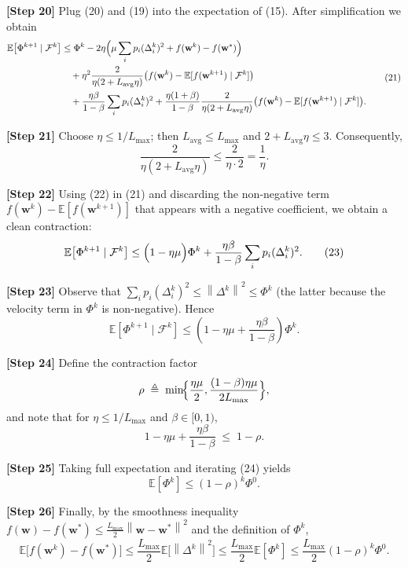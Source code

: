 \documentclass{article}
\newcommand{\E}{\mathbb{E}}
\newcommand{\norm}[1]{\left\|#1\right\|}
\begin{document}
\medskip
\noindent\textbf{[Step 20]} Plug (20) and (19) into the expectation of (15). After simplification we obtain
\[
\begin{aligned}
\E\!\left[\Phi^{k+1}\mid\mathcal F^{k}\right]
&\le \Phi^{k}
   -2\eta\Bigl(\mu\sum_{i}p_i(\Delta^{k}_{i})^{2}
                +f(\mathbf w^{k})-f(\mathbf w^{*})\Bigr) \\
&\quad +\eta^{2}\frac{2}{\eta(2+L_{\mathrm{avg}}\eta)}
          \bigl(f(\mathbf w^{k})- \E[f(\mathbf w^{k+1})\mid\mathcal F^{k}]\bigr)\\
&\quad +\frac{\eta\beta}{1-\beta}\sum_{i}p_i(\Delta^{k}_{i})^{2}
   +\frac{\eta(1+\beta)}{1-\beta}
          \frac{2}{\eta(2+L_{\mathrm{avg}}\eta)}
          \bigl(f(\mathbf w^{k})- \E[f(\mathbf w^{k+1})\mid\mathcal F^{k}]\bigr).
\end{aligned}
\tag{21}
\]

\medskip
\noindent\textbf{[Step 21]} Choose $\eta\le 1/L_{\max}$; then $L_{\mathrm{avg}}\le L_{\max}$ and
$2+L_{\mathrm{avg}}\eta\le 3$. Consequently,
\[
\frac{2}{\eta(2+L_{\mathrm{avg}}\eta)}\le \frac{2}{\eta\cdot2}= \frac{1}{\eta}.
\tag{22}
\]

\medskip
\noindent\textbf{[Step 22]} Using (22) in (21) and discarding the non‑negative term $f(\mathbf w^{k})- \E[f(\mathbf w^{k+1})]$ that appears with a negative coefficient, we obtain a clean contraction:
\[
\E\!\left[\Phi^{k+1}\mid\mathcal F^{k}\right]
\le \Bigl(1-\eta\mu\Bigr)\Phi^{k}
     +\frac{\eta\beta}{1-\beta}\sum_{i}p_i(\Delta^{k}_{i})^{2}.
\tag{23}
\]

\medskip
\noindent\textbf{[Step 23]} Observe that $\sum_{i}p_i(\Delta^{k}_{i})^{2}\le \norm{\Delta^{k}}^{2}\le \Phi^{k}$ (the latter because the velocity term in $\Phi^{k}$ is non‑negative). Hence
\[
\E\!\left[\Phi^{k+1}\mid\mathcal F^{k}\right]
\le \left(1-\eta\mu+\frac{\eta\beta}{1-\beta}\right)\Phi^{k}.
\tag{24}
\]

\medskip
\noindent\textbf{[Step 24]} Define the contraction factor
\[
\rho\;\triangleq\;\min\!\Bigl\{\frac{\eta\mu}{2},
                         \frac{(1-\beta)\eta\mu}{2L_{\max}}\Bigr\},
\]
and note that for $\eta\le 1/L_{\max}$ and $\beta\in[0,1)$,
\[
1-\eta\mu+\frac{\eta\beta}{1-\beta}
\;\le\; 1-\rho.
\tag{25}
\]

\medskip
\noindent\textbf{[Step 25]} Taking full expectation and iterating (24) yields
\[
\E[\Phi^{k}]\le (1-\rho)^{k}\Phi^{0}.
\tag{26}
\]

\medskip
\noindent\textbf{[Step 26]} Finally, by the smoothness inequality $f(\mathbf w)-f(\mathbf w^{*})\le \frac{L_{\max}}{2}\norm{\mathbf w-\mathbf w^{*}}^{2}$ and the definition of $\Phi^{k}$,
\[
\E\!\bigl[f(\mathbf w^{k})-f(\mathbf w^{*})\bigr]
\le \frac{L_{\max}}{2}\E\!\bigl[\norm{\Delta^{k}}^{2}\bigr]
\le \frac{L_{\max}}{2}\E[\Phi^{k}]
\le \frac{L_{\max}}{2}(1-\rho)^{k}\Phi^{0}.
\tag{27}
\]
\end{document}
